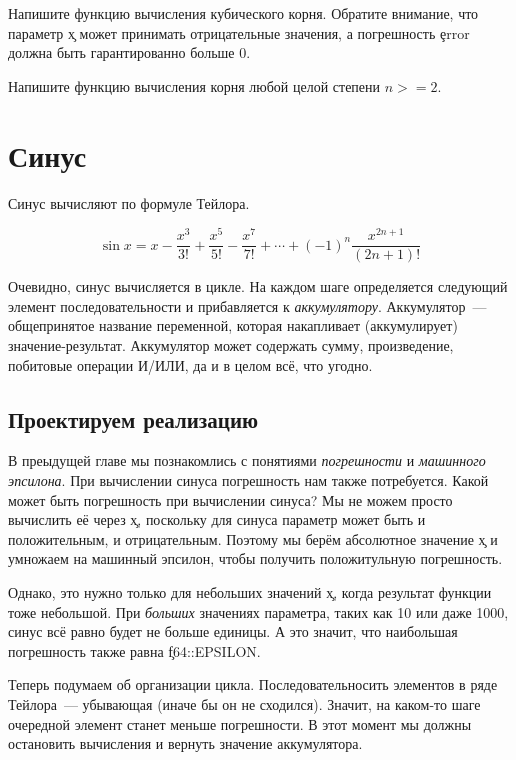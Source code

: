 \begin{Exercise}
  \Question
  Напишите функцию вычисления кубического корня.
  Обратите внимание, что параметр \c{x} может принимать отрицательные значения, а погрешность \c{error} должна быть гарантированно больше 0.
\end{Exercise}

\begin{Exercise}
  \Question
  Напишите функцию вычисления корня любой целой степени $n >= 2$.
\end{Exercise}

\section{Синус}

Синус вычисляют по формуле Тейлора.

$$
\sin x = x - \frac{x^3}{3!} + \frac{x^5}{5!} - \frac{x^7}{7!} + \cdots + (-1)^n \frac{x^{2n + 1}}{(2n + 1)!}
$$

Очевидно, синус вычисляется в цикле.
На каждом шаге определяется следующий элемент последовательности и прибавляется к {\em аккумулятору}.
Аккумулятор~--- общепринятое название переменной, которая накапливает (аккумулирует) значение-результат.
Аккумулятор может содержать сумму, произведение, побитовые операции И/ИЛИ, да и в целом всё, что угодно.

\subsection{Проектируем реализацию}

В преыдущей главе мы познакомлись с понятиями {\em погрешности} и {\em машинного эпсилона}.
При вычислении синуса погрешность нам также потребуется.
Какой может быть погрешность при вычислении синуса?
Мы не можем просто вычислить её через \c{x}, поскольку для синуса параметр может быть и положительным, и отрицательным.
Поэтому мы берём абсолютное значение \c{x} и умножаем на машинный эпсилон, чтобы получить положитульную погрешность.

Однако, это нужно только для небольших значений \c{x}, когда результат функции тоже небольшой.
При {\em больших} значениях параметра, таких как 10 или даже 1000, синус всё равно будет не больше единицы.
А это значит, что наибольшая погрешность также равна \c{f64::EPSILON}.

Теперь подумаем об организации цикла.
Последовательносить элементов в ряде Тейлора~--- убывающая (иначе бы он не сходился).
Значит, на каком-то шаге очередной элемент станет меньше погрешности.
В этот момент мы должны остановить вычисления и вернуть значение аккумулятора.

